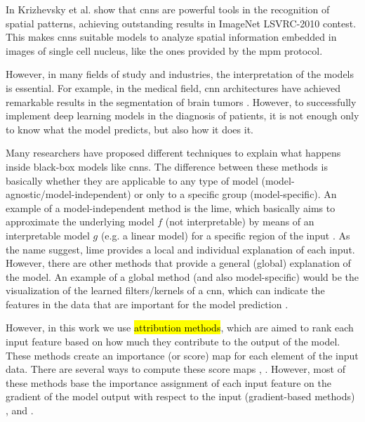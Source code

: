 In \cite{krizhevsky2012imagenet} Krizhevsky et al. show that \glspl{cnn} are powerful tools in the recognition of spatial patterns, achieving outstanding results in ImageNet LSVRC-2010 contest.
This makes \glspl{cnn} suitable models to analyze spatial information embedded in images of single cell nucleus, like the ones provided by the \gls{mpm} protocol.

However, in many fields of study and industries, the interpretation of the models is essential. For example, in the medical field, \gls{cnn} architectures have achieved remarkable results in the segmentation of brain tumors \cite{saleem2021visual}. However, to successfully implement deep learning models in the diagnosis of patients, it is not enough only to know what the model predicts, but also how it does it.

Many researchers have proposed different techniques to explain what happens inside black-box models like \glspl{cnn}.
The difference between these methods is basically whether they are applicable to any type of model (model-agnostic/model-independent) or only to a specific group (model-specific).
An example of a model-independent method is the \gls{lime}, which basically aims to approximate the underlying model $f$ (not interpretable) by means of an interpretable model $g$ (e.g. a linear model) for a specific region of the input \cite{ribeiro2016model}. As the name suggest, \gls{lime} provides a local and individual explanation of each input.
However, there are other methods that provide a general (global) explanation of the model. An example of a global method (and also model-specific) would be the visualization of the learned filters/kernels of a \gls{cnn}, which can indicate the features in the data that are important for the model prediction \cite{zeiler2014visualizing}.

However, in this work we use \hl{attribution methods}, which are aimed to rank each input feature based on how much they contribute to the output of the model.
These methods create an importance (or score) map for each element of the input data. There are several ways to compute these score maps \cite{JMLR:v11:baehrens10a}, \cite{ShrikumarGSK16}. However, most of these methods base the importance assignment of each input feature on the gradient of the model output with respect to the input (gradient-based methods) \cite{SimonyanVZ13}, \cite{BinderMBMS16} and \cite{Springenberg}.

